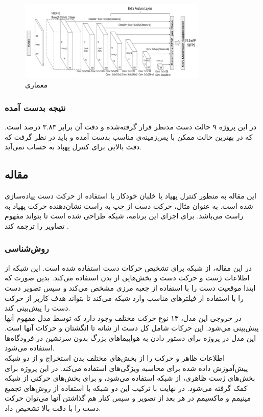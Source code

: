 \begin{figure}[h]
    \centering
    \includegraphics[width=0.8\textwidth]{VGG16.png}
    \caption{معماری }
\end{figure}

\subsubsection{نتیجه بدست آمده}
 در این پروژه ۹ حالت دست مدنظر قرار گرفته‌شده و دقت آن برابر ۳.۸۳ درصد است.
 که در بهترین حالت ممکن با پس‌زمینه‌ی مناسب بدست آمده و باید در نظر گرفت که دقت بالایی برای کنترل پهپاد به حساب نمی‌آید.


\subsection{مقاله }
این مقاله به منظور کنترل پهپاد یا خلبان خودکار با استفاده از حرکت دست پیاده‌سازی شده است. به عنوان مثال، حرکت دست از چپ به راست نشان‌دهنده حرکت پهپاد به راست می‌باشد. 
برای اجرای این برنامه، شبکه  طراحی شده است تا بتواند مفهوم تصاویر را ترجمه کند \cite{perera2018uav}.

\subsubsection{روش‌شناسی}
در این مقاله، از شبکه   برای تشخیص حرکات دست استفاده شده است. این شبکه از اطلاعات ژست و حرکت دست و بخش‌هایی از بدن  
استفاده می‌کند. بدین صورت که ابتدا موقعیت دست را با استفاده از جعبه مرزی مشخص می‌کند و سپس تصویر دست را با استفاده از فیلترهای مناسب وارد شبکه  می‌کند تا بتواند هدف کاربر از حرکت دست را پیش‌بینی کند.
\\
در خروجی این مدل، ۱۳ نوع حرکت مختلف وجود دارد که توسط مدل مفهوم آنها پیش‌بینی می‌شود. این حرکات شامل کل دست از شانه تا انگشتان و حرکات آنها است. این مدل در پروژه برای دستور دادن به هواپیماهای بزرگ بدون سرنشین در فرودگاه‌ها استفاده می‌شود.
\\
 اطلاعات ظاهر و حرکت را از بخش‌های مختلف بدن استخراج و از دو شبکه پیش‌آموزش داده شده برای محاسبه ویژگی‌های  استفاده می‌کند. در این پروژه برای بخش‌های ژست ظاهری، از شبکه  استفاده می‌شود، و برای 
بخش‌های حرکتی از شبکه  کمک گرفته می‌شود.
در نهایت با ترکیب این دو شبکه با استفاده از روش‌های تجمیع مینیمم و ماکسیمم در هر بعد از تصویر و سپس کنار هم گذاشتن آنها می‌توان حرکت دست را با دقت بالا تشخیص داد.

